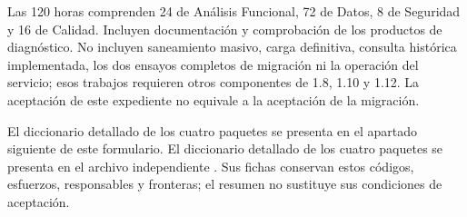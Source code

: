 Las 120 horas comprenden 24 de Análisis Funcional, 72 de Datos, 8 de Seguridad y 16 de Calidad. Incluyen documentación y comprobación de los productos de diagnóstico. No incluyen saneamiento masivo, carga definitiva, consulta histórica implementada, los dos ensayos completos de migración ni la operación del servicio; esos trabajos requieren otros componentes de 1.8, 1.10 y 1.12. La aceptación de este expediente no equivale a la aceptación de la migración.

\ifdefined\EnFormularioTCatorce
El diccionario detallado de los cuatro paquetes se presenta en el apartado siguiente de este formulario.
\else
El diccionario detallado de los cuatro paquetes se presenta en el archivo independiente .
\fi
Sus fichas conservan estos códigos, esfuerzos, responsables y fronteras; el resumen no sustituye sus condiciones de aceptación.
